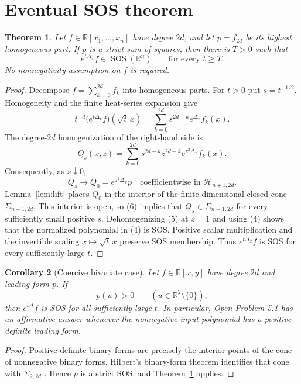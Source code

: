 \documentclass[11pt]{article}
\newtheorem{theorem}{Theorem}
\newtheorem{corollary}[theorem]{Corollary}
\newcommand{\R}{\mathbb R}
\newcommand{\cH}{\mathcal H}
\newcommand{\SOS}{\operatorname{SOS}}
\begin{document}
\section{Eventual SOS theorem}

\begin{theorem}\label{thm:general}
Let $f\in\R[x_1,\ldots,x_n]$ have degree $2d$, and let $p=f_{2d}$ be its
highest homogeneous part.  If $p$ is a strict sum of squares, then there is
$T>0$ such that
\[
  e^{t\Delta_x}f\in\SOS(\R^n)
  \qquad\text{for every }t\geq T.
\]
No nonnegativity assumption on $f$ is required.
\end{theorem}

\begin{proof}
Decompose $f=\sum_{k=0}^{2d}f_k$ into homogeneous parts.  For $t>0$ put
$s=t^{-1/2}$.  Homogeneity and the finite heat-series expansion give
\[
 t^{-d}\bigl(e^{t\Delta_x}f\bigr)(\sqrt t\,x)
 =\sum_{k=0}^{2d}s^{2d-k}e^{\Delta_x}f_k(x).
 \tag{4}
\]
The degree-$2d$ homogenization of the right-hand side is
\[
 Q_s(x,z)=\sum_{k=0}^{2d}s^{2d-k}z^{2d-k}
                 e^{z^2\Delta_x}f_k(x).
 \tag{5}
\]
Consequently, as $s\downarrow0$,
\[
  Q_s\longrightarrow Q_0=e^{z^2\Delta_x}p
  \quad\text{coefficientwise in }\cH_{n+1,2d}.
 \tag{6}
\]
Lemma~\ref{lem:lift} places $Q_0$ in the interior of the finite-dimensional
closed cone $\Sigma_{n+1,2d}$.  This interior is open, so (6) implies that
$Q_s\in\Sigma_{n+1,2d}$ for every sufficiently small positive $s$.
Dehomogenizing (5) at $z=1$ and using (4) shows that the normalized polynomial
in (4) is SOS.  Positive scalar multiplication and the invertible scaling
$x\mapsto\sqrt t\,x$ preserve SOS membership.  Thus
$e^{t\Delta_x}f$ is SOS for every sufficiently large $t$.
\end{proof}

\begin{corollary}[Coercive bivariate case]\label{cor:binary}
Let $f\in\R[x,y]$ have degree $2d$ and leading form $p$.  If
\[
  p(u)>0\qquad(u\in\R^2\setminus\{0\}),
\]
then $e^{t\Delta}f$ is SOS for all sufficiently large $t$.  In particular,
Open Problem 5.1 has an affirmative answer whenever the nonnegative input
polynomial has a positive-definite leading form.
\end{corollary}

\begin{proof}
Positive-definite binary forms are precisely the interior points of the cone
of nonnegative binary forms.  Hilbert's binary-form theorem identifies that
cone with $\Sigma_{2,2d}$ \cite{Hilbert}.  Hence $p$ is a strict SOS, and
Theorem~\ref{thm:general} applies.
\end{proof}
\end{document}
